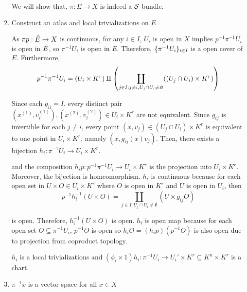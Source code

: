 \begin{remark}
\begin{longproof}
\begin{enumerate}
			We will show that, $\pi: E \to X$ is indeed a $\Str$-bundle.
			
			\item Construct an atlas and local trivializations on $E$
			
			As $\pi p: \Tilde{E} \to X$ is continuous, for any $i \in I$, $U_i$ is open in $X$ implies $p^{-1} \pi^{-1} U_i$ is open in $\Tilde{E}$, so $\pi^{-1} U_i$ is open in $E$. Therefore, $\set{\pi^{-1} U_i}_{i \in I}$ is a open cover of $E$. Furthermore,
			$$
			p^{-1} \pi^{-1} U_i = (U_i \times K^r) \amalg \tuple*{\coprod_{j \in I: j \neq i, U_j \cap U_i \neq \emptyset} ((U_j \cap U_i) \times K^r) }
			$$
			
			Since each $g_{ii} = I$, every distinct pair $(x^{(1)}, v_i^{(1)}), (x^{(2)}, v_i^{(2)}) \in U_i \times K^r$ are not equivalent. Since $g_{ij}$ is invertible for each $j \neq i$, every point $(x, v_j) \in (U_j \cap U_i) \times K^r$ is equivalent to one point in $U_i \times K^r$, namely $(x, g_{ij}(x) v_j)$. Then, there exists a bijection $h_i: \pi^{-1} U_i \to U_i \times K^r$.
			\begin{center}
			\end{center}
			
			and the composition $h_i p: p^{-1} \pi^{-1} U_i \to U_i \times K^r$ is the projection into $U_i \times K^r$. Moreover, the bijection is homeomorphism. $h_i$ is continuous because for each open set in $U \times O \in U_i \times K^r$ where $O$ is open in $K^r$ and $U$ is open in $U_i$, then
			$$
			p^{-1} h_i^{-1} (U \times O) = \coprod_{j \in I: U_j \cap U_i \neq \emptyset} (U \times g_{ij} O)
			$$
			
			is open. Therefore, $h_i^{-1} (U \times O)$ is open. $h_i$ is open map because for each open set $O \subseteq \pi^{-1} U_i$, $p^{-1} O$ is open so $h_i O = (h_i p) (p^{-1} O)$ is also open due to projection from coproduct topology.
			
			$h_i$ is a local trivializations and $(\phi_i \times 1) h_i: \pi^{-1} U_i \to U_i' \times K^r \subseteq K^n \times K^r$ is a chart.
			\item $\pi^{-1} x$ is a vector space for all $x \in X$
			

\end{enumerate}
\end{longproof}
\end{remark}
